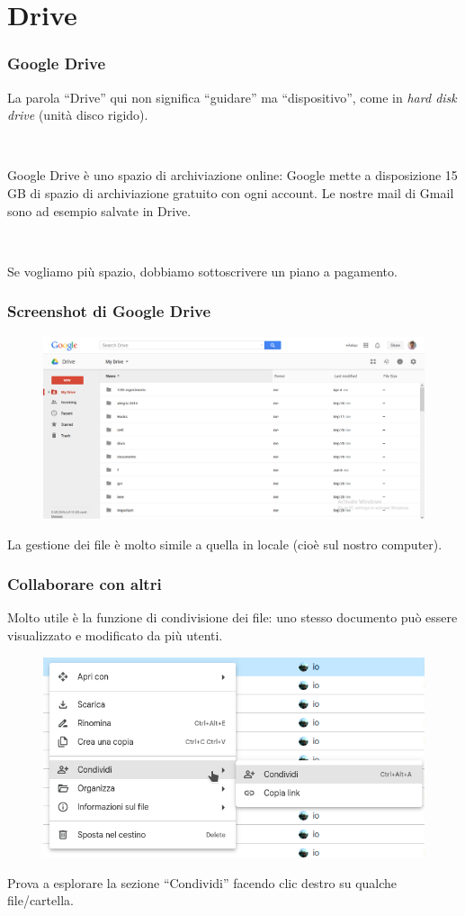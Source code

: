 \documentclass[handout]{beamer}
\begin{document}
\section{Drive}



\begin{frame}
\frametitle{Google Drive}
La parola ``Drive'' qui non significa ``guidare'' ma ``dispositivo'', come in \emph{hard disk drive} (unità disco rigido).\pause

~

Google Drive è uno \alert{spazio di archiviazione online}: Google mette a disposizione 15 GB di spazio di archiviazione gratuito con ogni account. Le nostre mail di Gmail sono ad esempio salvate in Drive.\pause

~

Se vogliamo più spazio, dobbiamo sottoscrivere un piano a pagamento.
\end{frame}

\begin{frame}
\frametitle{Screenshot di Google Drive}
\begin{figure}
  \includegraphics[width=\columnwidth]{img/drivescreen.png}
\end{figure}

La gestione dei file è molto simile a quella in locale (cioè sul nostro computer).
\end{frame}


\begin{frame}
\frametitle{Collaborare con altri}
Molto utile è la funzione di \alert{condivisione dei file}: uno stesso documento può essere visualizzato e modificato da più utenti.\pause

\begin{figure}
\includegraphics[width=.65\columnwidth]{img/driveshare.png}
\end{figure}

Prova a esplorare la sezione ``Condividi'' facendo clic destro su qualche file/cartella.
\end{frame}
\end{document}
